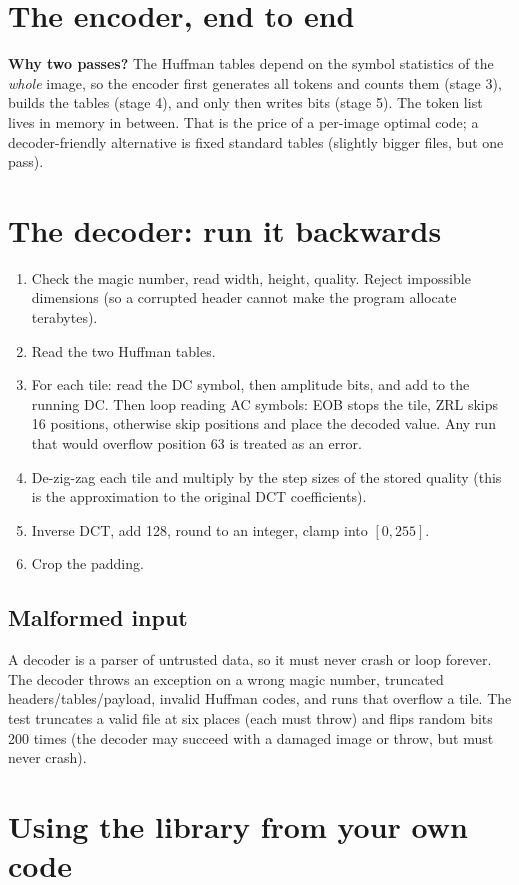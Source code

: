 \section{The encoder, end to end}



\begin{plain}
\textbf{Why two passes?} The Huffman tables depend on the symbol statistics of the \emph{whole} image, so the encoder first generates all tokens and counts them (stage 3), builds the tables (stage 4), and only then writes bits (stage 5). The token list lives in memory in between. That is the price of a per-image optimal code; a decoder-friendly alternative is fixed standard tables (slightly bigger files, but one pass).
\end{plain}

\section{The decoder: run it backwards}

\begin{enumerate}
\item Check the magic number, read width, height, quality. Reject impossible dimensions (so a corrupted header cannot make the program allocate terabytes).
\item Read the two Huffman tables.
\item For each tile: read the DC symbol, then  amplitude bits, and add to the running DC. Then loop reading AC symbols: EOB stops the tile, ZRL skips 16 positions, otherwise skip  positions and place the decoded value. Any run that would overflow position 63 is treated as an error.
\item De-zig-zag each tile and multiply by the step sizes of the stored quality (this is the approximation to the original DCT coefficients).
\item Inverse DCT, add 128, round to an integer, clamp into $[0,255]$.
\item Crop the padding.
\end{enumerate}



\subsection{Malformed input}

A decoder is a parser of untrusted data, so it must never crash or loop forever. The decoder throws an exception on a wrong magic number, truncated headers/tables/payload, invalid Huffman codes, and runs that overflow a tile. The test  truncates a valid file at six places (each must throw) and flips random bits 200 times (the decoder may succeed with a damaged image or throw, but must never crash).

\section{Using the library from your own code}


